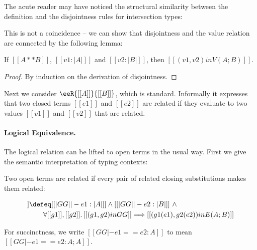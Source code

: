 The acute reader may have noticed the structural similarity between the
definition and the disjointness rules for intersection types:
This is not a coincidence -- we can show that disjointness and the value relation
are connected by the following lemma:

\begin{lemma} \label{lemma:disjoint}
  If $[[A ** B]]$, $[[  v1 : |A|  ]]$ and
  $[[  v2 : |B|  ]]$,
  then $[[   (v1, v2) in V ( A ; B  )    ]]$.
\end{lemma}
\begin{proof}
  By induction on the derivation of disjointness.
\end{proof}

Next we consider $\eeR{[[A]]}{[[B]]}$, which is standard. Informally it
expresses that two closed terms $[[e1]]$ and $[[e2]]$ are related if
they evaluate to two values $[[v1]]$ and $[[v2]]$ that are related.



\paragraph{Logical Equivalence.}

The logical relation can be lifted to open terms in the usual way. First we
give the semantic interpretation of typing contexts:

\begin{definition}
\end{definition}

Two open terms are related if every pair of related closing substitutions
makes them related:
\begin{definition}
  \begin{align*}
    [[GG |- e1 == e2 : A ; B]] & \defeq [[|GG| |- e1 : |A|]] \land [[|GG| |- e2 : | B | ]] \ \land \\
                                 & \qquad \forall [[g1]], [[g2]] .\, [[(g1, g2) in GG ]] \Longrightarrow [[(g1 (e1), g2 (e2))  in E (A ; B) ]]
  \end{align*}
\end{definition}
For succinctness, we write $[[GG |- e1 == e2 : A]]$ to mean $[[GG |- e1 == e2 : A ; A]]$.


